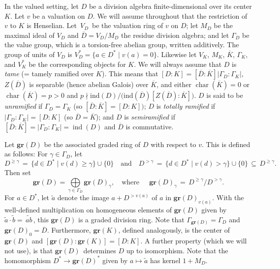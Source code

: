 \documentclass[11pt]{article}
\numberwithin{equation}{section}
\theoremstyle{plain}
\theoremstyle{remark}
\newcommand{\gr}{\mathbf{gr}}
\newcommand{\opn}{\operatorname}
\newcommand{\ind}{\text{ind}}
\newcommand{\charr}{\opn{char}}
\newcommand{\ov}{\overline}
\newcommand{\wt}{\widetilde}
\begin{document}
\smallskip

In the valued setting, let $D$ be a division algebra finite-dimensional over its center $K$. Let $v$ be a valuation on $D$.
We will assume throughout that the restriction of $v$ to $K$ is Henselian. 
Let~$V_D$~be the valuation ring of $v$ on $D$; let $M_D$ be the maximal ideal of $V_D$ and $\overline D=V_D/M_D$ 
the residue division algebra; and let $\Gamma_D$ be the value group, which is a torsion-free abelian group, written 
additively.  The group of units  of $V_D$ is $V_D^* = \{a\in D^*\mid v(a) = 0\}$.
 Likewise let  $V_K$, $M_K$, 
 $\overline K$, $\Gamma_K$, and $V_K^*$ be the corresponding objects for $K$. 
 We will always assume that $D$ is {\it{tame}} (= tamely ramified over $K$).  This means that 
 $[D:K] = [\ov D: \ov K]|\Gamma_D:\Gamma_K|$, $Z(\ov D)$ is separable (hence abelian Galois) over $\ov K$, and 
 either $\charr(\ov K) = 0$ or $\charr(\ov K) = p>0$ and $p \nmid \ind(D)\big /\big (\ind(\ov D) [Z(\ov D):\ov K]\big )$.
 $D$ is said to be {\it {unramified}} if $\Gamma_D = \Gamma_K$ (so $[\ov D: \ov K] = [D:K])$; $D$ is {\it{totally ramified}}
 if $|\Gamma_D:\Gamma_K| = [D:K]$ (so $\ov D = \ov K$); and $D$ is  {\it{semiramified}} if 
 $[\ov D:\ov K] = |\Gamma_D:\Gamma_K| = \opn{ind}(D)$ and $\ov D$ is commutative.
 
 Let $\gr(D)$ be the associated graded ring of $D$ with respect to $v$.  This is defined as follows:
 For $\gamma \in \Gamma_D$, let 
 $$
 D^{\ge \gamma} \, = \, \{ d\in D^*\mid v(d) \ge \gamma\} \cup \{0\} \quad \text {and} \quad
 D^{> \gamma} \, = \, \{ d\in D^*\mid v(d) > \gamma\} \cup \{0\} \, \subseteq \, D^{\ge \gamma}. 
 $$
 Then set 
 $$
 \gr(D) = \underset{\gamma\in \Gamma_D}{\textstyle{\bigoplus}} \gr(D)_\gamma, \quad \text{where}\ \quad \ 
 \gr(D)_\gamma\, = \, D^{\ge\gamma} /D^{> \gamma}.
 $$
 For $a\in D^*$, let $\wt a$ denote the image $a + D^{>v(a)} $ of $a$ in $\gr(D)_{v(a)}$.
 With the well-defined multiplication on homogeneous elements of $\gr(D)$ given 
 by $\wt a \cdot\wt b = \wt{\,ab\,}$, this $\gr(D)$ is a graded division ring.  Note that 
 $\Gamma_{\gr(D)} = \Gamma_D$ and $\gr(D)_0 = \ov D$. Furthermore,
 $\gr(K)$, defined analogously, is the center of~$\gr(D)$ and 
 $[\gr(D):\gr(K)] = [D: K]$. A further property (which we will not use),  is that $\gr(D)$~determines $D$ up to 
 isomorphism.  Note that the homomorphism $D^* \to \gr(D)^*$ given by $a \mapsto \wt a$
 has kernel $1+ M_D$. 
 
\end{document}
